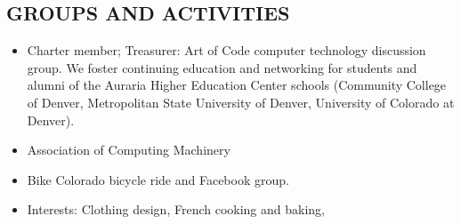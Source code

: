 \documentclass[line,margin]{res}
\begin{document}
\begin{resume}
\section{GROUPS AND ACTIVITIES}        
\begin{itemize}   %
          \item Charter member; Treasurer: Art of Code computer technology discussion group. We foster continuing education and networking for students and alumni of the Auraria Higher Education Center schools (Community College of Denver, Metropolitan State University of Denver, University of Colorado at Denver).
\item	Association of Computing Machinery
\item Bike Colorado bicycle ride and Facebook group.
\item Interests: Clothing design, French cooking and baking, 
\end{itemize}
 

\end{resume}
\end{document}
